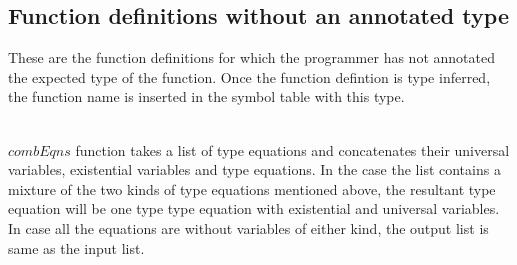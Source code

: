 \documentclass[11pt]{article}
\begin{document}
\subsection {Function definitions without an annotated type}
These are the function definitions for which the programmer has not annotated the expected type of the function. Once the function defintion is type inferred, the function name is inserted in the symbol table with this type. 

~~\\ 
$combEqns$ function takes a list of type equations and concatenates their universal variables, existential variables and type equations. In the case the list contains a mixture of the two kinds of type equations mentioned above, the resultant type equation will be one type type equation with existential and universal variables. In case all the equations are without variables of either kind, the output list is same as the input list.
~~\\~~\\
\end{document}
